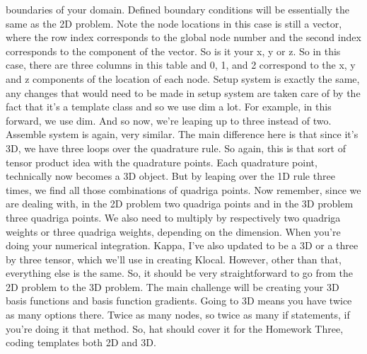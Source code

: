 \documentclass[10pt]{article}
\begin{document}
boundaries of your domain. Defined boundary conditions will be essentially the same as the 2D problem. Note the node locations in this case is still a vector, where the row index corresponds to the global node number and the second index corresponds to the component of the vector. So is it your x, y or z. So in this case, there are three columns in this table and 0, 1, and 2 correspond to the x, y and z components of the location of each node. Setup system is exactly the same, any changes that would need to be made in setup system are taken care of by the fact that it's a template class and so we use dim a lot. For example, in this forward, we use dim. And so now, we're leaping up to three instead of two. Assemble system is again, very similar. The main difference here is that since it's 3D, we have three loops over the quadrature rule. So again, this is that sort of tensor product idea with the quadrature points. Each quadrature point, technically now becomes a 3D object. But by leaping over the 1D rule three times, we find all those combinations of quadriga points. Now remember, since we are dealing with, in the 2D problem two quadriga points and in the 3D problem three quadriga points. We also need to multiply by respectively two quadriga weights or three quadriga weights, depending on the dimension. When you're doing your numerical integration. Kappa, I've also updated to be a 3D or a three by three tensor, which we'll use in creating Klocal. However, other than that, everything else is the same. So, it should be very straightforward to go from the 2D problem to the 3D problem. The main challenge will be creating your 3D basis functions and basis function gradients. Going to 3D means you have twice as many options there. Twice as many nodes, so twice as many if statements, if you're doing it that method. So, hat should cover it for the Homework Three, coding templates both 2D and 3D.
\end{document}
